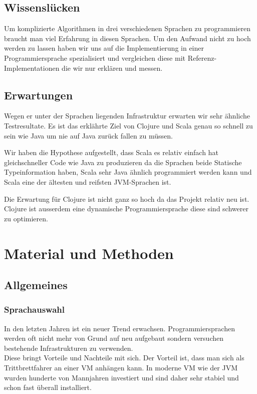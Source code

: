 \documentclass{fancydocument}
\begin{document}
\subsection{Wissenslücken}

Um komplizierte Algorithmen in drei verschiedenen Sprachen zu
programmieren braucht man viel Erfahrung in diesen Sprachen. Um den
Aufwand nicht zu hoch werden zu lassen haben wir uns auf die
Implementierung in einer Programmiersprache spezialisiert und
vergleichen diese mit Referenz-Implementationen die wir nur erklären
und messen.

\subsection{Erwartungen}

Wegen er unter der Sprachen liegenden Infrastruktur erwarten wir sehr
\"ahnliche Testresultate. Es ist das erkl\"ahrte Ziel von Clojure und
Scala genau so schnell zu sein wie Java um nie auf Java zur\"uck fallen
zu m\"ussen. 

Wir haben die Hypothese aufgestellt, dass Scala es relativ einfach hat
gleichschneller Code wie Java zu produzieren da die Sprachen beide 
Statische Typeinformation haben, Scala sehr Java \"ahnlich programmiert werden kann
und Scala eine der \"altesten und reifsten JVM-Sprachen ist.

Die Erwartung f\"ur Clojure ist nicht ganz so hoch da das Projekt relativ neu ist. Clojure 
ist ausserdem eine dynamische Programmiersprache diese sind schwerer zu optimieren.

\section{Material und Methoden}

\subsection{Allgemeines}

\subsubsection{Sprachauswahl}

In den letzten Jahren ist ein neuer Trend
erwachsen. Programmiersprachen werden oft nicht mehr von Grund auf neu
aufgebaut sondern versuchen bestehende Infrastrukturen zu verwenden.
\\
Diese bringt Vorteile und Nachteile mit sich. Der Vorteil ist, dass
man sich als Trittbrettfahrer an einer VM anh\"angen kann. In moderne
VM wie der JVM wurden hunderte von Mannjahren investiert und sind
daher sehr stabiel und schon fast \"uberall installiert.
\end{document}
